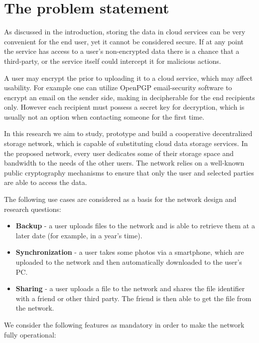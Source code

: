 \section{The problem statement}

As discussed in the introduction, storing the data in cloud services
can be very convenient for the end user, yet it cannot be considered
secure. If at any point the service has access to a user's non-encrypted
data there is a chance that a third-party, or the service itself
could intercept it for malicious actions.

A user may encrypt the prior to uploading it to a cloud service,
which may affect usability.
For example one can utilize OpenPGP email-security software \citep{rfc3156} to
encrypt an email on the sender side, making in decipherable for
the end recipients only. However each recipient must possess a secret
key for decryption, which is usually not an option when contacting
someone for the first time.

In this research we aim to study, prototype and build a
cooperative decentralized \pp storage network, which is capable
of substituting cloud data storage services. In the proposed \pp network,
every user dedicates some of their storage space and bandwidth
to the needs of the other users. The network relies on
a well-known public cryptography mechanisms to ensure that
only the user and selected parties are able to access the data.

The following use cases are considered as a basis for the
network design and research questions:

\begin{itemize}
\item \textbf{Backup} - a user uploads files to the network and
      is able to retrieve them at a later date (for example,
      in a year's time).
\item \textbf{Synchronization} - a user takes some photos via a smartphone,
      which are uploaded to the network and then automatically
      downloaded to the user's PC.
\item \textbf{Sharing} - a user uploads a file to the network and
      shares the file identifier with a friend or other third party.
      The friend is then able to get the file from the network.
\end{itemize}

We consider the following features as mandatory in order to make
the network fully operational:


